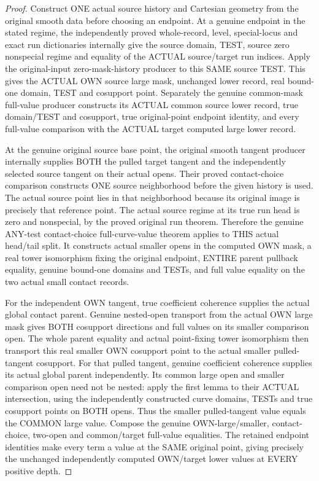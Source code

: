 \begin{proof}
Construct ONE actual source history and Cartesian geometry from the
original smooth data before choosing an endpoint. At a genuine endpoint
in the stated regime, the independently proved whole-record, level,
special-locus and exact run dictionaries internally give the source
domain, TEST, source zero nonspecial regime and equality of the ACTUAL
source/target run indices. Apply the original-input zero-mask-history
producer to this SAME source TEST. This gives the ACTUAL OWN source
large mask, unchanged lower record, real bound-one domain, TEST and
cosupport point. Separately the genuine common-mask full-value producer
constructs its ACTUAL common source lower record, true domain/TEST and
cosupport, true original-point endpoint identity, and every full-value
comparison with the ACTUAL target computed large lower record.

At the genuine original source base point, the original smooth tangent
producer internally supplies BOTH the pulled target tangent and the
independently selected source tangent on their actual opens. Their
proved contact-choice comparison constructs ONE source neighborhood
before the given history is used. The actual source point lies in that
neighborhood because its original image is precisely that reference
point. The actual source regime at its true run head is zero and
nonspecial, by the proved original run theorem. Therefore the genuine
ANY-test contact-choice full-curve-value theorem applies to THIS actual
head/tail split. It constructs actual smaller opens in the computed OWN
mask, a real tower isomorphism fixing the original endpoint, ENTIRE
parent pullback equality, genuine bound-one domains and TESTs, and full
value equality on the two actual small contact records.

For the independent OWN tangent, true coefficient coherence supplies
the actual global contact parent. Genuine nested-open transport from
the actual OWN large mask gives BOTH cosupport directions and full
values on its smaller comparison open. The whole parent equality and
actual point-fixing tower isomorphism then transport this real smaller
OWN cosupport point to the actual smaller pulled-tangent cosupport.
For that pulled tangent, genuine coefficient coherence supplies its
actual global parent independently. Its common large open and smaller
comparison open need not be nested: apply the first lemma to their
ACTUAL intersection, using the independently constructed curve
domains, TESTs and true cosupport points on BOTH opens. Thus the smaller
pulled-tangent value equals the COMMON large value. Compose the genuine
OWN-large/smaller, contact-choice, two-open and common/target full-value
equalities. The retained endpoint identities make every term a value
at the SAME original point, giving precisely the unchanged independently
computed OWN/target lower values at EVERY positive depth.


\end{proof}
